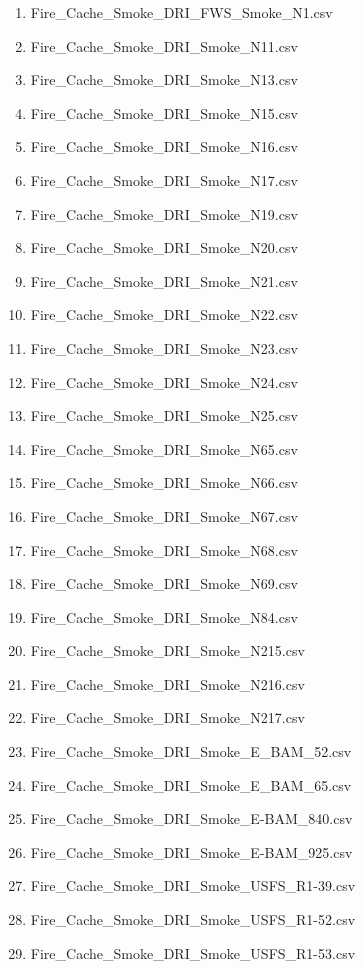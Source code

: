 \begin{enumerate}
\item Fire\_Cache\_Smoke\_DRI\_FWS\_Smoke\_N1.csv
\item Fire\_Cache\_Smoke\_DRI\_Smoke\_N11.csv
\item Fire\_Cache\_Smoke\_DRI\_Smoke\_N13.csv
\item Fire\_Cache\_Smoke\_DRI\_Smoke\_N15.csv
\item Fire\_Cache\_Smoke\_DRI\_Smoke\_N16.csv
\item Fire\_Cache\_Smoke\_DRI\_Smoke\_N17.csv
\item Fire\_Cache\_Smoke\_DRI\_Smoke\_N19.csv
\item Fire\_Cache\_Smoke\_DRI\_Smoke\_N20.csv
\item Fire\_Cache\_Smoke\_DRI\_Smoke\_N21.csv
\item Fire\_Cache\_Smoke\_DRI\_Smoke\_N22.csv
\item Fire\_Cache\_Smoke\_DRI\_Smoke\_N23.csv
\item Fire\_Cache\_Smoke\_DRI\_Smoke\_N24.csv
\item Fire\_Cache\_Smoke\_DRI\_Smoke\_N25.csv
\item Fire\_Cache\_Smoke\_DRI\_Smoke\_N65.csv
\item Fire\_Cache\_Smoke\_DRI\_Smoke\_N66.csv
\item Fire\_Cache\_Smoke\_DRI\_Smoke\_N67.csv
\item Fire\_Cache\_Smoke\_DRI\_Smoke\_N68.csv
\item Fire\_Cache\_Smoke\_DRI\_Smoke\_N69.csv
\item Fire\_Cache\_Smoke\_DRI\_Smoke\_N84.csv
\item Fire\_Cache\_Smoke\_DRI\_Smoke\_N215.csv
\item Fire\_Cache\_Smoke\_DRI\_Smoke\_N216.csv
\item Fire\_Cache\_Smoke\_DRI\_Smoke\_N217.csv
\item Fire\_Cache\_Smoke\_DRI\_Smoke\_E\_BAM\_52.csv
\item Fire\_Cache\_Smoke\_DRI\_Smoke\_E\_BAM\_65.csv
\item Fire\_Cache\_Smoke\_DRI\_Smoke\_E-BAM\_840.csv
\item Fire\_Cache\_Smoke\_DRI\_Smoke\_E-BAM\_925.csv
\item Fire\_Cache\_Smoke\_DRI\_Smoke\_USFS\_R1-39.csv
\item Fire\_Cache\_Smoke\_DRI\_Smoke\_USFS\_R1-52.csv
\item Fire\_Cache\_Smoke\_DRI\_Smoke\_USFS\_R1-53.csv

\end{enumerate}
